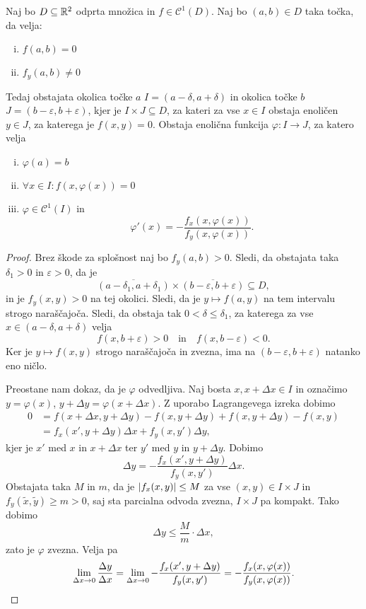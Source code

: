 \begin{izrek}
Naj bo $D \subseteq \mathbb{R}^2$ odprta množica in
$f \in \mathcal{C}^1(D)$. Naj bo $(a,b) \in D$ taka točka, da
velja:

\begin{enumerate}[i)]
\item $f(a,b) = 0$
\item $f_y(a,b) \ne 0$
\end{enumerate}

Tedaj obstajata okolica točke $a$ $I=(a-\delta, a+\delta)$ in
okolica točke $b$ $J=(b-\varepsilon, b+\varepsilon)$, kjer je
$I \times J \subseteq D$, za kateri za vse $x \in I$ obstaja
enoličen $y\in J$, za katerega je $f(x,y) = 0$. Obstaja enolična
funkcija $\varphi \colon I \to J$, za katero velja

\begin{enumerate}[i)]
\item $\varphi(a) = b$
\item $\forall x \in I \colon f(x,\varphi(x)) = 0$
\item $\varphi \in \mathcal{C}^1(I)$ in
\[
\varphi'(x) = - \frac{f_x(x,\varphi(x))}{f_y(x,\varphi(x))}.
\]
\end{enumerate}
\end{izrek}

\begin{proof}
Brez škode za splošnost naj bo $f_y(a,b) > 0$. Sledi, da obstajata
taka $\delta_1 > 0$ in $\varepsilon > 0$, da je
\[
\overline{(a-\delta_1,a+\delta_1)} \times
\overline{(b-\varepsilon,b+\varepsilon)} \subseteq D,
\]
in je $f_y(x,y) > 0$ na tej okolici. Sledi, da je
$y \mapsto f(a,y)$ na tem intervalu strogo naraščajoča. Sledi, da
obstaja tak $0 < \delta \leq \delta_1$, za katerega za vse
$x \in (a-\delta, a+\delta)$ velja
\[
f(x, b+\varepsilon) > 0
\quad \text{in} \quad
f(x, b-\varepsilon) < 0.
\]
Ker je $y \mapsto f(x,y)$ strogo naraščajoča in zvezna, ima na
$(b-\varepsilon,b+\varepsilon)$ natanko eno ničlo.

Preostane nam dokaz, da je $\varphi$ odvedljiva. Naj bosta
$x, x+\Delta x \in I$ in označimo
$y = \varphi(x)$, $y + \Delta y = \varphi(x + \Delta x)$. Z uporabo
Lagrangevega izreka dobimo
\begin{align*}
0 &=
f(x + \Delta x, y + \Delta y) - f(x, y + \Delta y) +
f(x, y + \Delta y) - f(x, y)
\\
&= f_x(x', y + \Delta y) \Delta x + f_y(x, y') \Delta y,
\end{align*}
kjer je $x'$ med $x$ in $x + \Delta x$ ter $y'$ med $y$ in
$y + \Delta y$. Dobimo
\[
\Delta y = - \frac{f_x(x', y + \Delta y)}{f_y(x, y')} \Delta x.
\]
Obstajata taka $M$ in $m$, da je $\left\lvert f_x(x,y)\right\rvert \leq M$ za vse
$(x,y) \in I \times J$ in
$f_y(\widetilde{x},\widetilde{y}) \geq m > 0$, saj sta parcialna
odvoda zvezna, $I \times J$ pa kompakt. Tako dobimo
\[
\Delta y \leq \frac{M}{m} \cdot \Delta x,
\]
zato je $\varphi$ zvezna. Velja pa
\[
\lim_{\Delta x \to 0}\frac{\Delta y}{\Delta x} =
\lim_{\Delta x \to 0} - \frac{f_x(x', y + \Delta y)}{f_y(x, y')} =
- \frac{f_x(x,\varphi(x))}{f_y(x,\varphi(x))}. \qedhere
\]
\end{proof}


